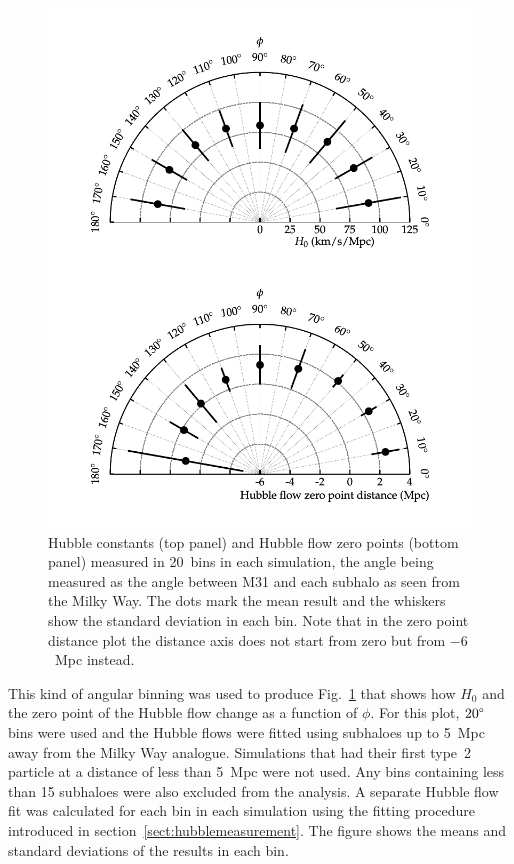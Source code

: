 \documentclass[english, oneside]{HYgradu}
\begin{document}
\begin{figure}
    \centering
    \includegraphics{kuvat/directionalHF.pdf}
    \caption{Hubble constants (top panel) and Hubble flow zero points (bottom panel) measured in 20\textdegree\ bins in each simulation, the angle being measured as the angle between M31 and each subhalo as seen from the Milky Way. The dots mark the mean result and the whiskers show the standard deviation in each bin. Note that in the zero point distance plot the distance axis does not start from zero but from $-6$~Mpc instead.}\label{fig:directionalHF}
\end{figure}

This kind of angular binning was used to produce Fig.~\ref{fig:directionalHF} that shows how $H_0$ and the zero point of the Hubble flow change as a function of $\phi$. For this plot, $20 \degree$ bins were used and the Hubble flows were fitted using subhaloes up to 5~Mpc away from the Milky Way analogue. Simulations that had their first type~2 particle at a distance of less than 5~Mpc were not used. Any bins containing less than 15 subhaloes were also excluded from the analysis. A separate Hubble flow fit was calculated for each bin in each simulation using the fitting procedure introduced in section~\ref{sect:hubblemeasurement}. The figure shows the means and standard deviations of the results in each bin.
\end{document}
